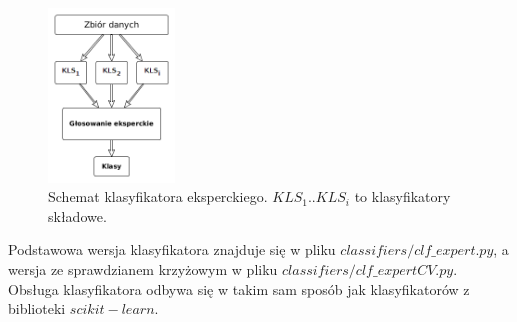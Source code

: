 \begin{figure}[H]
	\centering
	\includegraphics[width=0.3\textwidth]{./images/klas_ekspercki.png}
	\caption{Schemat klasyfikatora eksperckiego. $KLS_1..KLS_i$ to klasyfikatory składowe.}
	\label{fig:klasyfikator_ekspercki}
\end{figure}
Podstawowa wersja klasyfikatora znajduje się w pliku $classifiers/clf\_expert.py$, a wersja ze sprawdzianem krzyżowym w pliku $classifiers/clf\_expertCV.py$. Obsługa klasyfikatora odbywa się w takim sam sposób jak klasyfikatorów z biblioteki $scikit-learn$.
